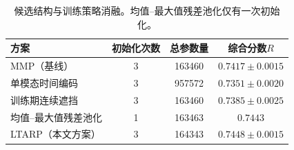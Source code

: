 \begin{table}[H]\centering\small
\caption{候选结构与训练策略消融。均值--最大值残差池化仅有一次初始化。}
\label{tab:q2_ablation}
\begin{tabular}{lccc}
\toprule
方案 & 初始化次数 & 总参数量 & 综合分数$R$\\
\midrule
MMP（基线） & 3 & 163460 & $0.7417\pm0.0015$\\
单模态时间编码 & 3 & 957572 & $0.7351\pm0.0020$\\
训练期连续遮挡 & 3 & 163460 & $0.7385\pm0.0025$\\
均值--最大值残差池化 & 1 & 163463 & $0.7443$\\
LTARP（本文方案） & 3 & 164343 & $0.7448\pm0.0015$\\
\bottomrule
\end{tabular}
\end{table}